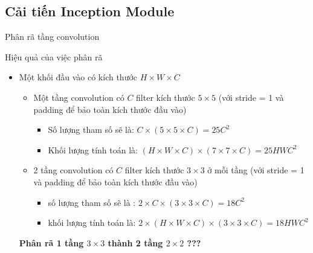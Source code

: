 \documentclass[compress]{beamer}
\begin{document}
\subsection{Cải tiến Inception Module}
\begin{frame}{Phân rã tầng convolution}
\begin{itemize}
\end{itemize}
\end{frame}

\begin{frame}{Hiệu quả của việc phân rã}
\begin{itemize}
\item Một khối đầu vào có kích thước $H \times W \times C$ 
\begin{itemize}
\item Một tầng convolution có $C$ filter kích thước $5 \times 5$ (với stride = 1 và padding để bảo toàn kích thước đầu vào) 
\begin{itemize}
\item Số lượng tham số sẽ là: $C \times (5 \times 5 \times C) = 25C^2$ 
\item Khối lượng tính toán là: $(H \times W \times C) \times (7 \times 7 \times C) = 25HWC^2$ 
\end{itemize}
\item 2 tầng convolution có $C$ filter kích thước $3 \times 3$ ở mỗi tầng (với stride = 1 và padding để bảo toàn kích thước đầu vào) 
\begin{itemize}
\item số lượng tham số sẽ là : $2 \times C \times (3 \times 3 \times C) = 18C^2$
\item khối lượng tính toán là: $2 \times (H \times W \times C) \times (3 \times 3 \times C) = 18HWC^2$
\end{itemize}
\end{itemize}
 \textbf{Phân rã 1 tầng $3\times 3$ thành 2 tầng $2 \times 2$ ???}
\end{itemize}
\end{frame}
\end{document}
